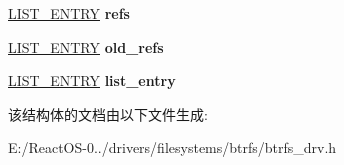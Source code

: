 \begin{DoxyCompactItemize}
\hyperlink{struct___l_i_s_t___e_n_t_r_y}{L\+I\+S\+T\+\_\+\+E\+N\+T\+RY} {\bfseries refs}
\item 
\mbox{\label{structchanged__extent_a9296f2491f78c58e4ff142f19947da1f}} 
\hyperlink{struct___l_i_s_t___e_n_t_r_y}{L\+I\+S\+T\+\_\+\+E\+N\+T\+RY} {\bfseries old\+\_\+refs}
\item 
\mbox{\label{structchanged__extent_ab2df44d0acbe565647192bb3b76d19ad}} 
\hyperlink{struct___l_i_s_t___e_n_t_r_y}{L\+I\+S\+T\+\_\+\+E\+N\+T\+RY} {\bfseries list\+\_\+entry}
\end{DoxyCompactItemize}


该结构体的文档由以下文件生成\+:\begin{DoxyCompactItemize}
\item 
E\+:/\+React\+O\+S-\/0../drivers/filesystems/btrfs/btrfs\+\_\+drv.\+h\end{DoxyCompactItemize}
